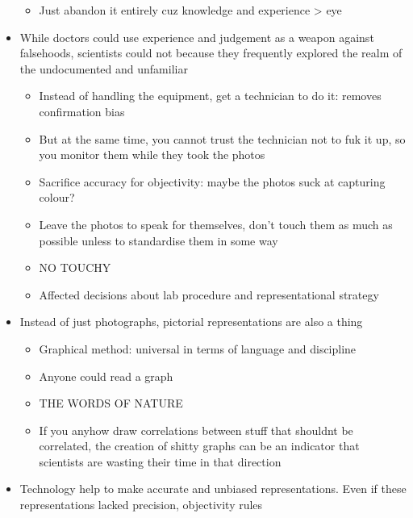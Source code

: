 \documentclass[a4paper]{article}
\begin{document}
\begin{itemize}
\begin{itemize}[label=$\circ$]
		\item Just abandon it entirely cuz knowledge and experience > eye
	\end{itemize} 
	\item While doctors could use experience and judgement as a weapon against falsehoods, scientists could not because they frequently explored the realm of the undocumented and unfamiliar
	\begin{itemize}[label=$\circ$]
		\item Instead of handling the equipment, get a technician to do it: removes confirmation bias 
		\item But at the same time, you cannot trust the technician not to fuk it up, so you monitor them while they took the photos
		\item Sacrifice accuracy for objectivity: maybe the photos suck at capturing colour?
		\item Leave the photos to speak for themselves, don’t touch them as much as possible unless to standardise them in some way
		\item NO TOUCHY
		\item Affected decisions about lab procedure and representational strategy
	\end{itemize}
	\item Instead of just photographs, pictorial representations are also a thing
	\begin{itemize}[label=$\circ$]
		\item Graphical method: universal in terms of language and discipline
		\item Anyone could read a graph
		\item THE WORDS OF NATURE
		\item If you anyhow draw correlations between stuff that shouldnt be correlated, the creation of shitty graphs can be an indicator that scientists are wasting their time in that direction
	\end{itemize}
	\item Technology help to make accurate and unbiased representations. Even if these representations lacked precision, objectivity rules
\end{itemize}
\end{document}

